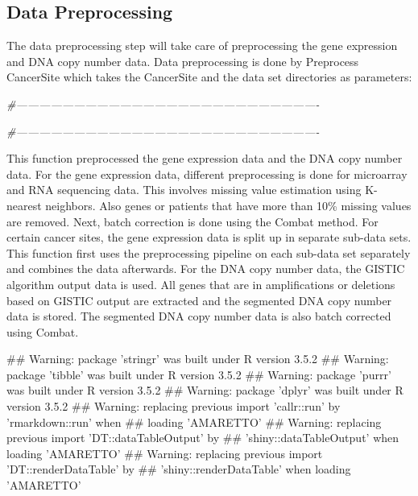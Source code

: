 \documentclass[8pt,a4,]{article}
\newcommand{\hlcom}[1]{\textcolor[rgb]{0.502,0.502,0.502}{\textit{#1}}}%
\newenvironment{Shaded}{\begin{myshaded}}{\end{myshaded}}
\renewenvironment{verbatim}{\color{codecolor}\begin{myshaded}\begin{oldverbatim}}{\end{oldverbatim}\end{myshaded}}
\newcommand{\CommentTok}[1]{\hlcom{#1}}
\begin{document}
\newpage

\subsection{Data Preprocessing}\label{data-preprocessing}

The data preprocessing step will take care of preprocessing the gene
expression and DNA copy number data. Data preprocessing is done by
Preprocess CancerSite which takes the CancerSite and the data set
directories as parameters:

\begin{Shaded}
\begin{Highlighting}[]
\CommentTok{#-------------------------------------------------------------------------------}


\CommentTok{#-------------------------------------------------------------------------------}
\end{Highlighting}
\end{Shaded}

This function preprocessed the gene expression data and the DNA copy
number data. For the gene expression data, different preprocessing is
done for microarray and RNA sequencing data. This involves missing value
estimation using K-nearest neighbors. Also genes or patients that have
more than 10\% missing values are removed. Next, batch correction is
done using the Combat method. For certain cancer sites, the gene
expression data is split up in separate sub-data sets. This function
first uses the preprocessing pipeline on each sub-data set separately
and combines the data afterwards. For the DNA copy number data, the
GISTIC algorithm output data is used. All genes that are in
amplifications or deletions based on GISTIC output are extracted and the
segmented DNA copy number data is stored. The segmented DNA copy number
data is also batch corrected using Combat.

\begin{verbatim}
## Warning: package 'stringr' was built under R version 3.5.2
## Warning: package 'tibble' was built under R version 3.5.2
## Warning: package 'purrr' was built under R version 3.5.2
## Warning: package 'dplyr' was built under R version 3.5.2
## Warning: replacing previous import 'callr::run' by 'rmarkdown::run' when
## loading 'AMARETTO'
## Warning: replacing previous import 'DT::dataTableOutput' by
## 'shiny::dataTableOutput' when loading 'AMARETTO'
## Warning: replacing previous import 'DT::renderDataTable' by
## 'shiny::renderDataTable' when loading 'AMARETTO'
\end{verbatim}
\end{document}
